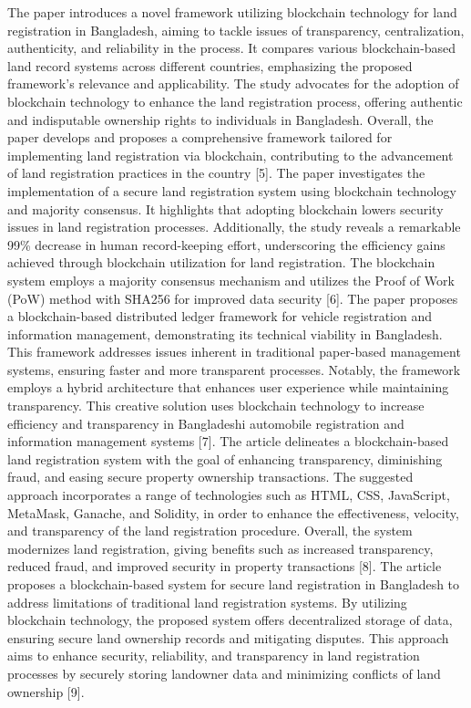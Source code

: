 \documentclass[conference]{IEEEtran}
\begin{document}
The paper introduces a novel framework utilizing blockchain technology for land registration in Bangladesh, aiming to tackle issues of transparency, centralization, authenticity, and reliability in the process. It compares various blockchain-based land record systems across different countries, emphasizing the proposed framework's relevance and applicability. The study advocates for the adoption of blockchain technology to enhance the land registration process, offering authentic and indisputable ownership rights to individuals in Bangladesh. Overall, the paper develops and proposes a comprehensive framework tailored for implementing land registration via blockchain, contributing to the advancement of land registration practices in the country [5].
The paper investigates the implementation of a secure land registration system using blockchain technology and majority consensus. It highlights that adopting blockchain lowers security issues in land registration processes. Additionally, the study reveals a remarkable 99\% decrease in human record-keeping effort, underscoring the efficiency gains achieved through blockchain utilization for land registration. The blockchain system employs a majority consensus mechanism and utilizes the Proof of Work (PoW) method with SHA256 for improved data security [6].
The paper proposes a blockchain-based distributed ledger framework for vehicle registration and information management, demonstrating its technical viability in Bangladesh. This framework addresses issues inherent in traditional paper-based management systems, ensuring faster and more transparent processes. Notably, the framework employs a hybrid architecture that enhances user experience while maintaining transparency. This creative solution uses blockchain technology to increase efficiency and transparency in Bangladeshi automobile registration and information management systems [7].
The article delineates a blockchain-based land registration system with the goal of enhancing transparency, diminishing fraud, and easing secure property ownership transactions. The suggested approach incorporates a range of technologies such as HTML, CSS, JavaScript, MetaMask, Ganache, and Solidity, in order to enhance the effectiveness, velocity, and transparency of the land registration procedure. Overall, the system modernizes land registration, giving benefits such as increased transparency, reduced fraud, and improved security in property transactions [8].
The article proposes a blockchain-based system for secure land registration in Bangladesh to address limitations of traditional land registration systems. By utilizing blockchain technology, the proposed system offers decentralized storage of data, ensuring secure land ownership records and mitigating disputes. This approach aims to enhance security, reliability, and transparency in land registration processes by securely storing landowner data and minimizing conflicts of land ownership [9].
\end{document}
